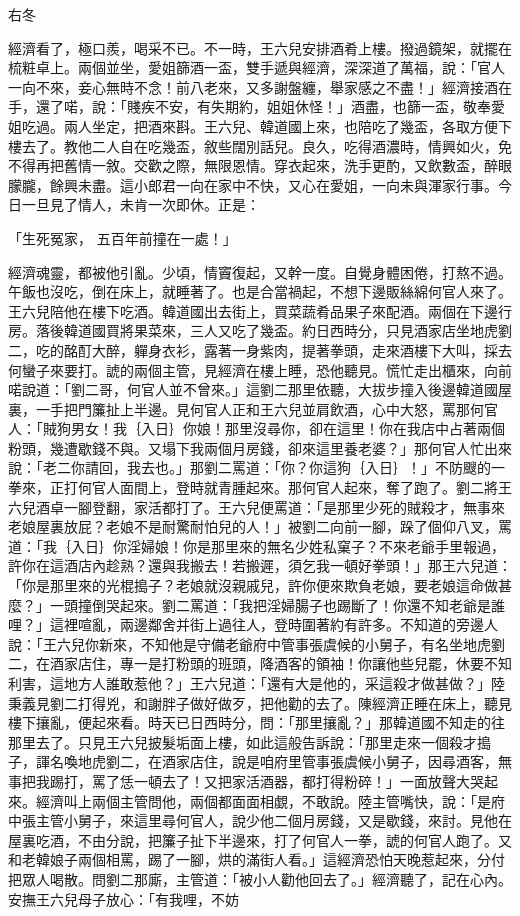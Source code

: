 右冬

經濟看了，極口羨，喝采不已。不一時，王六兒安排酒肴上樓。撥過鏡架，就擺在梳粧卓上。兩個並坐，愛姐篩酒一盃，雙手遞與經濟，深深道了萬福，說：「官人一向不來，妾心無時不念！前八老來，又多謝盤纏，舉家感之不盡！」經濟接酒在手，還了喏，說：「賤疾不安，有失期約，姐姐休怪！」酒盡，也篩一盃，敬奉愛姐吃過。兩人坐定，把酒來斟。王六兒、韓道國上來，也陪吃了幾盃，各取方便下樓去了。教他二人自在吃幾盃，敘些闊別話兒。良久，吃得酒濃時，情興如火，免不得再把舊情一敘。交歡之際，無限恩情。穿衣起來，洗手更酌，又飲數盃，醉眼朦朧，餘興未盡。這小郎君一向在家中不快，又心在愛姐，一向未與渾家行事。今日一旦見了情人，未肯一次即休。正是：

「生死冤家，  五百年前撞在一處！」

經濟魂靈，都被他引亂。少頃，情竇復起，又幹一度。自覺身體困倦，打熬不過。午飯也沒吃，倒在床上，就睡著了。也是合當禍起，不想下邊販絲綿何官人來了。王六兒陪他在樓下吃酒。韓道國出去街上，買菜蔬肴品果子來配酒。兩個在下邊行房。落後韓道國買將果菜來，三人又吃了幾盃。約日西時分，只見酒家店坐地虎劉二，吃的酩酊大醉，軃身衣衫，露著一身紫肉，提著拳頭，走來酒樓下大叫，採去何蠻子來要打。諕的兩個主管，見經濟在樓上睡，恐他聽見。慌忙走出櫃來，向前喏說道：「劉二哥，何官人並不曾來。」這劉二那里依聽，大拔步撞入後邊韓道國屋裏，一手把門簾扯上半邊。見何官人正和王六兒並肩飲酒，心中大怒，罵那何官人：「賊狗男女！我｛入日｝你娘！那里沒尋你，卻在這里！你在我店中占著兩個粉頭，幾遭歇錢不與。又塌下我兩個月房錢，卻來這里養老婆？」那何官人忙出來說：「老二你請回，我去也。」那劉二罵道：「你？你這狗｛入日｝！」不防颼的一拳來，正打何官人面間上，登時就青腫起來。那何官人起來，奪了跑了。劉二將王六兒酒卓一腳登翻，家活都打了。王六兒便罵道：「是那里少死的賊殺才，無事來老娘屋裏放屁？老娘不是耐驚耐怕兒的人！」被劉二向前一腳，跺了個仰八叉，罵道：「我｛入日｝你淫婦娘！你是那里來的無名少姓私窠子？不來老爺手里報過，許你在這酒店內趁熟？還與我搬去！若搬遲，須乞我一頓好拳頭！」那王六兒道：「你是那里來的光棍搗子？老娘就沒親戚兒，許你便來欺負老娘，要老娘這命做甚麼？」一頭撞倒哭起來。劉二罵道：「我把淫婦腸子也踢斷了！你還不知老爺是誰哩？」這裡喧亂，兩邊鄰舍并街上過往人，登時圍著約有許多。不知道的旁邊人說：「王六兒你新來，不知他是守備老爺府中管事張虞候的小舅子，有名坐地虎劉二，在酒家店住，專一是打粉頭的班頭，降酒客的領袖！你讓他些兒罷，休要不知利害，這地方人誰敢惹他？」王六兒道：「還有大是他的，采這殺才做甚做？」陸秉義見劉二打得兇，和謝胖子做好做歹，把他勸的去了。陳經濟正睡在床上，聽見樓下攘亂，便起來看。時天已日西時分，問：「那里攘亂？」那韓道國不知走的往那里去了。只見王六兒披髮垢面上樓，如此這般告訴說：「那里走來一個殺才搗子，諢名喚地虎劉二，在酒家店住，說是咱府里管事張虞候小舅子，因尋酒客，無事把我踢打，罵了恁一頓去了！又把家活酒器，都打得粉碎！」一面放聲大哭起來。經濟叫上兩個主管問他，兩個都面面相覷，不敢說。陸主管嘴快，說：「是府中張主管小舅子，來這里尋何官人，說少他二個月房錢，又是歇錢，來討。見他在屋裏吃酒，不由分說，把簾子扯下半邊來，打了何官人一拳，諕的何官人跑了。又和老韓娘子兩個相罵，踢了一腳，烘的滿街人看。」這經濟恐怕天晚惹起來，分付把眾人喝散。問劉二那廝，主管道：「被小人勸他回去了。」經濟聽了，記在心內。安撫王六兒母子放心：「有我哩，不妨